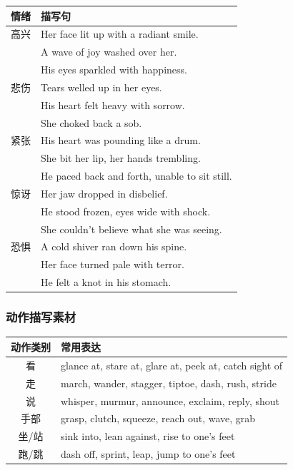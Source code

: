 \begin{center}
\begin{tabular}{c|l}
\textbf{情绪} & \textbf{描写句} \\ \toprule
高兴 & Her face lit up with a radiant smile. \\
 & A wave of joy washed over her. \\
 & His eyes sparkled with happiness. \\
悲伤 & Tears welled up in her eyes. \\
 & His heart felt heavy with sorrow. \\
 & She choked back a sob. \\
紧张 & His heart was pounding like a drum. \\
 & She bit her lip, her hands trembling. \\
 & He paced back and forth, unable to sit still. \\
惊讶 & Her jaw dropped in disbelief. \\
 & He stood frozen, eyes wide with shock. \\
 & She couldn't believe what she was seeing. \\
恐惧 & A cold shiver ran down his spine. \\
 & Her face turned pale with terror. \\
 & He felt a knot in his stomach. \\
\bottomrule
\end{tabular}
\end{center}

\subsubsection{动作描写素材}

\begin{center}
\begin{tabular}{c|l}
\textbf{动作类别} & \textbf{常用表达} \\ \toprule
看 & glance at, stare at, glare at, peek at, catch sight of \\
走 & march, wander, stagger, tiptoe, dash, rush, stride \\
说 & whisper, murmur, announce, exclaim, reply, shout \\
手部 & grasp, clutch, squeeze, reach out, wave, grab \\
坐/站 & sink into, lean against, rise to one's feet \\
跑/跳 & dash off, sprint, leap, jump to one's feet \\
\bottomrule
\end{tabular}
\end{center}

